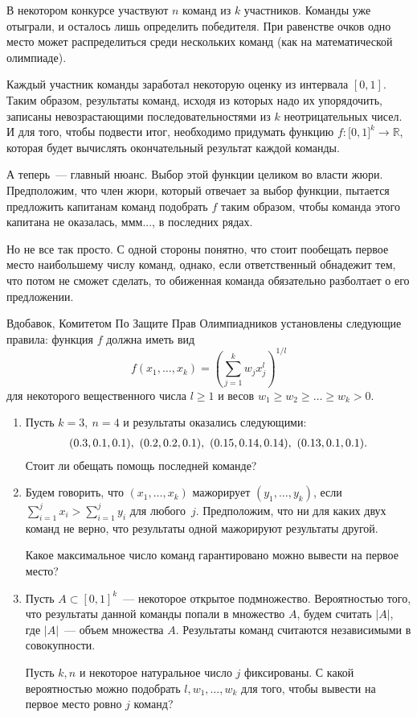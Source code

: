 
В некотором конкурсе участвуют $n$ команд из $k$ участников. Команды уже отыграли, и осталось лишь определить победителя. При равенстве очков одно место может распределиться среди нескольких команд (как на математической олимпиаде).

Каждый участник команды заработал некоторую оценку из интервала $[0,1]$. Таким образом, результаты команд, исходя из которых надо их упорядочить, записаны невозрастающими последовательностями из $k$ неотрицательных чисел. И для того, чтобы подвести итог, необходимо придумать функцию $f: \mathbb [0,1]^k\to \mathbb R$, которая будет вычислять окончательный результат каждой команды.

А теперь~— главный нюанс. Выбор этой функции целиком во власти жюри. Предположим, что член жюри, который отвечает за выбор функции, пытается предложить капитанам команд подобрать $f$ таким образом, чтобы команда этого капитана не оказалась, ммм..., в последних рядах. 

Но не все так просто. С одной стороны понятно, что стоит пообещать первое место наибольшему числу команд, однако, если ответственный обнадежит тем, что потом не сможет сделать, то обиженная команда обязательно разболтает о его предложении.

Вдобавок, Комитетом По Защите Прав Олимпиадников установлены следующие правила: функция $f$ должна иметь вид
$$
f(x_1,\dots,x_k) =\left (\sum\limits_{j = 1}^kw_jx_j^l  \right )^{1/l}
$$
для некоторого вещественного числа $l\geq 1$ и весов $w_1\geq w_2\geq\dots\geq w_k> 0$.


\bigskip
\begin{enumerate}
\item Пусть $k = 3,\ n = 4$ и результаты оказались следующими:
$$\bar{l}
(0.3,0.1,0.1),\ (0.2,0.2,0.1),\ (0.15, 0.14, 0.14),\ (0.13,0.1,0.1).
\ear$$
Стоит ли обещать помощь последней команде?

\item
 Будем говорить, что $(x_1,\dots, x_k)$ мажорирует $(y_1,\dots,y_k)$, если $\sum\limits_{i = 1}^jx_i > \sum\limits_{i = 1}^jy_i$ для любого~$j$. Предположим, что ни для каких двух команд не верно, что результаты одной мажорируют результаты другой.

Какое максимальное число команд гарантировано можно вывести на первое место?

\item Пусть $A\subset [0,1]^k$~— некоторое открытое подмножество. Вероятностью того, что результаты данной команды попали в множество $A$, будем считать $|A|$, где $|A|$~— объем множества $A$. Результаты команд считаются независимыми в совокупности.

Пусть $k,n$ и некоторое натуральное число $j$ фиксированы. С какой вероятностью можно подобрать $l,w_1,\dots, w_k$ для того, чтобы вывести на первое место ровно $j$ команд?

\end{enumerate}





